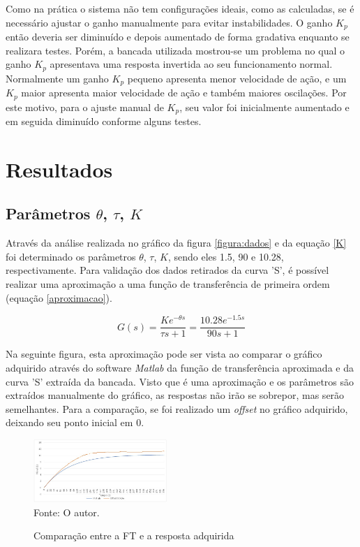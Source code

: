 \documentclass[conference]{IEEEtran}
\begin{document}
Como na prática o sistema não tem configurações ideais, como as calculadas, se é necessário ajustar o ganho manualmente para evitar instabilidades. O ganho $K_p$ então deveria ser diminuído e depois aumentado de forma gradativa enquanto se realizara testes. Porém, a bancada utilizada mostrou-se um problema no qual o ganho $K_p$ apresentava uma resposta invertida ao seu funcionamento normal. Normalmente um ganho $K_p$ pequeno apresenta menor velocidade de ação, e um $K_p$ maior apresenta maior velocidade de ação e também maiores oscilações. Por este motivo, para o ajuste manual de $K_p$, seu valor foi inicialmente aumentado e em seguida diminuído conforme alguns testes.


\section{Resultados}

\subsection{Parâmetros $\theta$, $\tau$, $K$}
Através da análise realizada no gráfico da figura \ref{figura:dados} e da equação \ref{K} foi determinado os parâmetros $\theta$, $\tau$, $K$, sendo eles 1.5, 90 e 10.28, respectivamente. Para validação dos dados retirados da curva 'S', é possível realizar uma aproximação a uma função de transferência de primeira ordem (equação \ref{aproximacao}).

\begin{equation}
    G(s) = \frac{Ke^{-\theta s}}{\tau s + 1} = \frac{10.28e^{-1.5 s}}{90s + 1}
    \label{aproximacao}
\end{equation}

Na seguinte figura, esta aproximação pode ser vista ao comparar o gráfico adquirido através do software \textit{Matlab} da função de transferência aproximada e da curva 'S' extraída da bancada. Visto que é uma aproximação e os parâmetros são extraídos manualmente do gráfico, as respostas não irão se sobrepor, mas serão semelhantes. Para a comparação, se foi realizado um \textit{offset} no gráfico adquirido, deixando seu ponto inicial em 0.

\begin{figure}[!http]
    \centering
    \caption{Comparação entre a FT e a resposta adquirida}
    \includegraphics[width=0.45\textwidth]{imagens/Aproximacao.jpeg}\\
    Fonte: O autor.
    \label{figura:aprox}
\end{figure}
\end{document}
